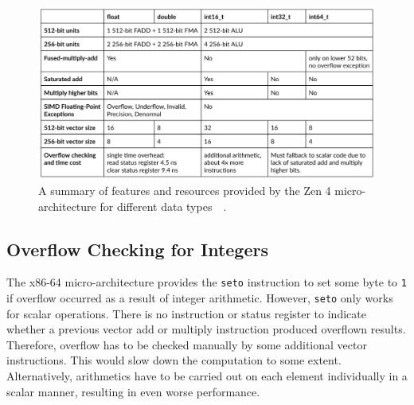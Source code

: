 \documentclass[logo,bsc,singlespacing,parskip]{infthesis}
\newcommand{\dtshort}{\texttt{int16\char`_t}}
\begin{document}

\begin{figure}[H]\captionsetup{name=Figure}
    \includegraphics[width=\linewidth]{image/arch-table.png}
    \caption{A summary of features and resources provided by the Zen 4
    micro-architecture for different data
    types~\cite{Zen4Critique}~\cite{Zen2ChipWiki}.}
    \label{archtable}
\end{figure}

\subsection{Overflow Checking for Integers}
\label{sec:overflow-int}

The x86-64 micro-architecture provides the \texttt{seto} instruction to set some
byte to \texttt{1} if overflow occurred as a result of integer arithmetic.
However, \texttt{seto} only works for scalar operations. There is no instruction
or status register to indicate whether a previous vector add or multiply
instruction produced overflown results. Therefore, overflow has to be
checked manually by some additional vector instructions. This would slow down
the computation to some extent. Alternatively, arithmetics have to be
carried out on each element individually in a scalar manner, resulting in even
worse performance. 


\end{document}
